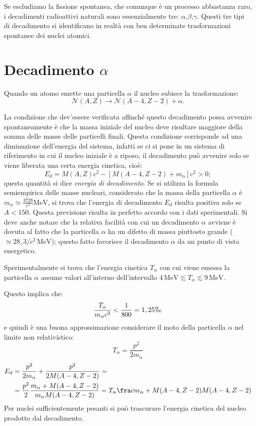 Se escludiamo la fissione spontanea, che comunque è un processo abbastanza 
raro, i decadimenti radioattivi naturali sono essenzialmente tre:
$\alpha$,$\beta$,$\gamma$. Questi tre tipi di decadimento si identificano in 
realtà con ben determinate trasformazioni spontanee dei nuclei atomici.

\section{Decadimento $\alpha$}

Quando un atomo emette una particella $\alpha$ il nucleo subisce la
trasformazione:
\begin{equation}
\mathcal{N}(A,Z)\rightarrow\mathcal{N}(A-4,Z-2)+\alpha.
\end{equation}

La condizione che dev'essere verificata affinché questo decadimento possa
avvenire spontaneamente è che la massa iniziale del nucleo deve risultare
maggiore della somma delle masse delle particelli finali. Questa condizione
corrisponde ad una diminuzione dell'energia del sistema, infatti se ci si pone
in un sistema di riferimento in cui il nucleo iniziale è a riposo, il
decadimento può avvenire solo se viene liberata una certa energia cinetica,
cioè:
\begin{equation}
E_d=M(A,Z)c^2-[M(A-4,Z-2)+m_{\alpha}]c^2>0;
\end{equation}
questa quantità  si dice \textit{energia di decadimento}. Se si utilizza la
formula semiempirica delle masse nucleari, considerato che la massa della
particella $\alpha$ è 
$m_{\alpha}\simeq\frac{3728}{c^2}\si{\mega\electronvolt}$,
si trova che l'energia di decadimento $E_d$ risulta positiva solo se $A<150$.
Questa previsione risulta in perfetto accordo con i dati sperimentali. Si deve
anche notare che la relativa facilità con cui un decadimento $\alpha$ avviene 
è
dovuta al fatto che la particella $\alpha$ ha un difetto di massa piuttosto
grande ($\simeq28,3/c^2\,\si{\mega\electronvolt}$); questo fatto favorisce il
decadimento $\alpha$ da un punto di vista energetico.

Sperimentalmente si trova che l'energia cinetica $T_{\alpha}$ con cui viene
emessa la particella $\alpha$ assume valori all'interno dell'intervallo
$4\,\si{\mega\electronvolt}\lesssim T_{\alpha}\lesssim
9\,\si{\mega\electronvolt}$.

Questo implica che:
\[
\frac{T_{\alpha}}{m_{\alpha}c^2}<\frac{1}{800}=1,25\permil
\]
e quindi è una buona approssimazione considerare il moto della particella
$\alpha$ nel limite non relativistico:
\[
T_{\alpha}=\frac{p^2}{2m_{\alpha}}
\]
\begin{equation}
  \begin{split}
  E_d&=\frac{p^2}{2m_{\alpha}}+\frac{p^2}{2M(A-4,Z-2)}=\\
  
&=\frac{p^2}{2}\frac{m_{\alpha}+M(A-4,Z-2)}{m_{\alpha}M(A-4,Z-2)}=T_{\alpha}\fra
c{m_{\alpha}+M(A-4,Z-2)}{M(A-4,Z-2)}
\end{split}
\end{equation}
Per nuclei sufficientemente pesanti si può trascurare l'energia cinetica del
nucleo prodotto dal decadimento.

